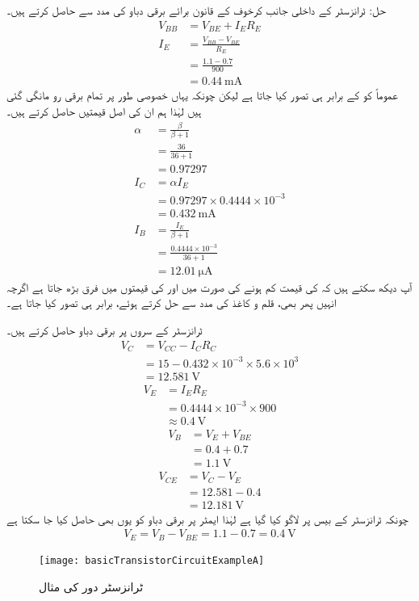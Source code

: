 حل:
ٹرانزسٹر کے داخلی جانب کرخوف کے قانون برائے برقی دباو کی مدد سے  حاصل کرتے ہیں۔
\begin{align*}
V_{BB} &=V_{BE}+I_{E}R_{E}\\
I_E&=\frac{V_{BB}-V_{BE}}{R_E}\\
&=\frac{1.1-0.7}{900}\\
&=\SI{0.44}{\milli \ampere}
\end{align*}
عموماً  کو  کے برابر ہی تصور کیا جاتا ہے لیکن چونکہ یہاں خصوصی طور پر تمام برقی رو مانگی گئی ہیں لہٰذا ہم ان کی اصل قیمتیں حاصل کرتے ہیں۔
\begin{align*}
\alpha&=\frac{\beta}{\beta+1}\\
&=\frac{36}{36+1}\\
&=\num{0.97297}
\\
I_C&=\alpha I_E\\
&=0.97297 \times  0.4444  \times 10^{-3}\\
&=\SI{0.432}{\milli \ampere}\\
I_B&=\frac{I_E}{\beta+1}\\
&=\frac{0.4444 \times 10^{-3}}{36+1}\\
&=\SI{12.01}{\micro \ampere}
\end{align*}
آپ دیکھ سکتے ہیں کہ  کی قیمت کم ہونے کی صورت میں  اور  کی قیمتوں میں فرق بڑھ جاتا ہے اگرچہ انہیں پھر بھی، قلم و کاغذ کی مدد سے حل کرتے ہوئے، برابر ہی تصور کیا جاتا ہے۔

ٹرانزسٹر کے سروں پر برقی دباو حاصل کرتے ہیں۔
\begin{align*}
V_C&=V_{CC}-I_{C}R_{C}\\
&=15-0.432 \times 10^{-3} \times 5.6 \times 10^{3}\\
&=\SI{12.581}{\volt}
\end{align*}
%
\begin{align*}
V_E&=I_{E}R_{E}\\
&=0.4444 \times 10^{-3} \times 900\\
&\approx \SI{0.4}{\volt} 
\end{align*}
%
\begin{align*}
V_B&=V_E+V_{BE}\\
&=0.4+0.7\\
&= \SI{1.1}{\volt}
\end{align*}
%
\begin{align*}
V_{CE}&=V_C-V_E\\
&=12.581-0.4\\
&=\SI{12.181}{\volt}
\end{align*}
چونکہ ٹرانزسٹر کے بیس پر  لاگو کیا گیا ہے لہٰذا ایمٹر پر برقی دباو کو یوں بھی حاصل کیا جا سکتا ہے
\begin{align*}
V_E=V_B-V_{BE}=1.1-0.7=\SI{0.4}{\volt}
\end{align*}
%
\begin{figure}
\centering
\texttt{[image: basicTransistorCircuitExampleA]}
\caption{ ٹرانزسٹر دور کی مثال}
\label{شکل_ٹرانزسٹر_دور_کی_مثال}
\end{figure}

